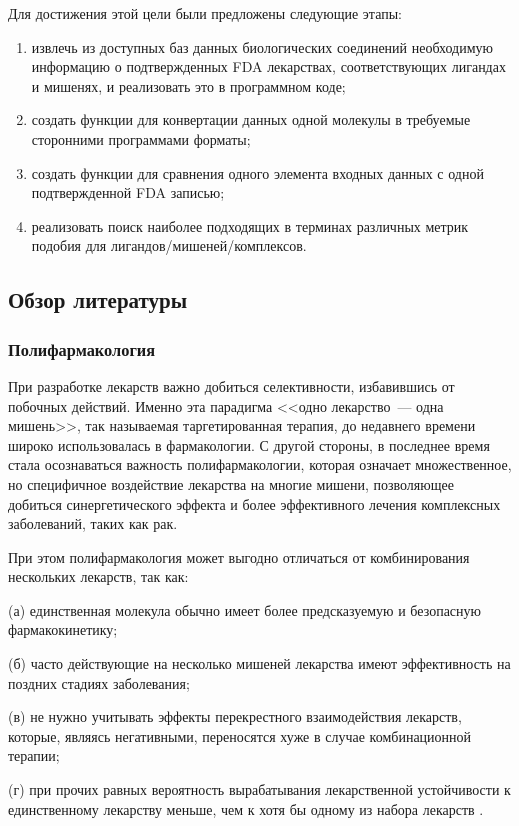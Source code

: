 \documentclass[a4paper,14pt]{article}         %
\begin{document}
Для достижения этой цели были предложены следующие этапы:
\begin{enumerate}
	\item извлечь из доступных баз данных биологических соединений необходимую информацию о подтвержденных FDA лекарствах, соответствующих лигандах и мишенях, и реализовать это в программном коде;
	\item создать функции для конвертации данных одной молекулы в требуемые сторонними программами форматы;
	\item создать функции для сравнения одного элемента входных данных с одной подтвержденной FDA записью;
	\item реализовать поиск наиболее подходящих в терминах различных метрик подобия для лигандов/мишеней/комплексов.
\end{enumerate}

\subsection{Обзор литературы}
\subsubsection{Полифармакология}
При разработке лекарств важно добиться селективности, избавившись от побочных действий. Именно эта парадигма <<одно лекарство~--- одна мишень>>, так называемая таргетированная терапия, до недавнего времени широко использовалась в фармакологии. С другой стороны, в последнее время стала осознаваться важность полифармакологии, которая означает множественное, но специфичное воздействие лекарства на многие мишени, позволяющее добиться синергетического эффекта и более эффективного лечения комплексных заболеваний, таких как рак\cite{Anighoro2014}. 

При этом полифармакология может выгодно отличаться от комбинирования нескольких лекарств, так как:

(а) единственная молекула обычно имеет более предсказуемую и безо\-пасную фармакокинетику; 

(б) часто действующие на несколько мишеней лекарства имеют  эффективность на поздних стадиях заболевания; 

(в) не нужно учитывать эффекты перекрестного взаимодействия лекарств, которые, являясь негативными, переносятся хуже в случае комбинационной терапии; 

(г) при прочих равных  вероятность вырабатывания лекарственной устойчивости к единственному лекарству меньше, чем к хотя бы одному из набора лекарств \cite{Anighoro2014}.
\end{document}
